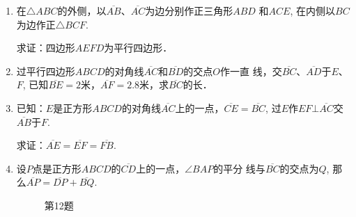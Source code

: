 \begin{enumerate}
\begin{figure}[htp]
\begin{minipage}[t]{0.48\textwidth}
\begin{tikzpicture}[>=latex, scale=1]
    \end{tikzpicture}
    \caption*{第8题}
    \end{minipage}
    \end{figure}

\item 在$\triangle ABC$的外侧，以$\overline{AB}$、$\overline{AC}$为边分别作正三角形$ABD$
和$ACE$, 在内侧以$BC$为边作正$\triangle BCF$.

求证：四边形$AEFD$为平行四边形．
\item 过平行四边形$ABCD$的对角线$\overline{AC}$和$\overline{BD}$的交点$O$作一直
线，交$\overline{BC}$、$\overline{AD}$于$E$、$F$, 已知$\overline{BE}=2$米，$\overline{AF}=2.8$米，求$\overline{BC}$的长．
\item 已知：$E$是正方形$ABCD$的对角线$\overline{AC}$上的一点，$\overline{CE}=\overline{BC}$, 过$E$作$EF\bot \overline{AC}$交$\overline{AB}$于$F$.

求证：$\overline{AE}=\overline{EF}=\overline{FB}$.

\item 设$P$点是正方形$ABCD$的$\overline{CD}$上的一点，$\angle BAP$的平分
线与$\overline{BC}$的交点为$Q$, 那么$\overline{AP}=\overline{DP}+\overline{BQ}$.

\begin{figure}[htp]\centering
    \begin{minipage}[t]{0.48\textwidth}
    \centering
{}
    \caption*{第11题}
    \end{minipage}
    \begin{minipage}[t]{0.48\textwidth}
    \centering
    \caption*{第12题}
    \end{minipage}
    \end{figure}


\end{enumerate}
